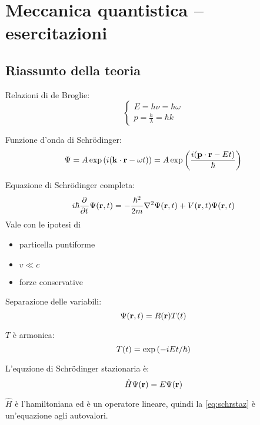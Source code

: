 \chapter{Meccanica quantistica -- esercitazioni}

\section{Riassunto della teoria}

Relazioni di de Broglie:
\begin{equation}
    \begin{cases}
        E = h \nu = \hbar \omega \\
        p = \frac{h}{\lambda} = \hbar k
    \end{cases}
\end{equation}

Funzione d'onda di Schrödinger:
\begin{equation}
    \Psi = A \operatorname{exp}\left( i (\mathbf{k} \cdot \mathbf{r} - \omega t) \right)
    = A \operatorname{exp}\left( \frac{i (\mathbf{p} \cdot \mathbf{r} - Et)}{\hbar} \right)
\end{equation}

Equazione di Schrödinger completa:
\begin{equation}
    \im \hbar \parder{t} \Psi(\p, t) = - \frac{\hbar^2}{2 m} \lapl \Psi(\p, t) + V(\p, t) \Psi(\p, t)
\end{equation}
Vale con le ipotesi di
\begin{itemize}
    \item particella puntiforme
    \item $v \ll c$
    \item forze conservative
\end{itemize}

Separazione delle variabili:
\begin{equation}
    \Psi(\mathbf{r}, t) = R(\mathbf{r}) T(t)
\end{equation}

$T$ è armonica:
\begin{equation}
    T(t) = \operatorname{exp}\left( -i E t/\hbar \right)
\end{equation}

L'equzione di Schrödinger stazionaria è:
\begin{equation}
\label{eq:schrstaz}
    \hat{H} \Psi(\mathbf{r}) = E \Psi(\mathbf{r})
\end{equation}

$\hat{H}$ è l'hamiltoniana ed è un operatore lineare, quindi la \eqref{eq:schrstaz} è un'equazione agli autovalori.

